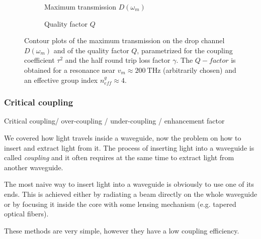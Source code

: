 \begin{figure}
	\centering
	\begin{subfigure}[t]{0.47\textwidth}
		\centering
		
		\caption{Maximum transmission $D\left( \omega_m \right)$}
		\label{fig:D_contour}
	\end{subfigure}
	\hspace{0.03\textwidth}
	\begin{subfigure}[t]{0.47\textwidth}
		\centering
		
		\caption{Quality factor $Q$}
		\label{fig:Q_contour}
	\end{subfigure}
	\caption{Contour plots of the maximum transmission on the drop channel $D\left( \omega_m \right)$ and of the quality factor $Q$, parametrized for the coupling coefficient $\tau^2$ and the half round trip loss factor $\gamma$.
	The $Q-factor$ is obtained for a resonance near $v_m\approx\SI{200}{\THz}$ (arbitrarily chosen) and an effective group index $n_{eff}^g \approx 4$.
	}
	\label{fig:APF_contour_plots}
\end{figure}

\subsubsection{Critical coupling}
\label{sssec:Critical_coupling}
Critical coupling/ over-coupling / under-coupling / enhancement factor

We covered how light travels inside a waveguide, now the problem on how to insert and extract light from it.
The process of inserting light into a waveguide is called \textit{coupling} and it often requires at the same time to extract light from another waveguide.

The most naive way to insert light into a waveguide is obviously to use one of its ends.
This is achieved either by radiating a beam directly on the whole waveguide or by focusing it inside the core with some lensing mechanism (e.g. tapered optical fibers).

These methods are very simple, however they have a low coupling efficiency. %

